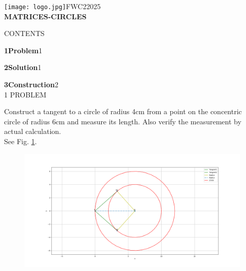 \documentclass[a4paper,10pt]{report}
\begin{document}
\raggedright{\texttt{[image: logo.jpg]}}\hspace{12.425cm}\raggedleft FWC22025\vspace{2mm}\\
\centering\Large\textbf{MATRICES-CIRCLES}\vspace{5mm}
\begin{multicols}{2}
\centering \large\textsc{C}\footnotesize\textsc{ONTENTS}\vspace{5mm}\\
\raggedright\large\textbf{1\hspace{1cm}Problem}\hspace{5.2cm}1\vspace{5mm}\\
\raggedright\large\textbf{2\hspace{1cm}Solution}\hspace{5.25cm}1\vspace{5mm}\\
\raggedright\large\textbf{3\hspace{1cm}Construction}\hspace{4.25cm}2\vspace{5mm}\\
\centering \large\textsc{1  P}\footnotesize\textsc{ROBLEM}\vspace{5mm}\\
\raggedright\large{
\fi
	Construct a tangent to a circle of radius 4cm from a point on the concentric circle of radius 6cm and measure its length. Also verify the measurement by actual calculation.
	\\
	\solution See Fig. 
		\ref{fig:10/11/2/2}.
	\begin{figure}[!ht]
		\centering
 \includegraphics[width=\columnwidth]{chapters/10/11/2/2/figs/main.png}
		\caption{}
		\label{fig:10/11/2/2}
  	\end{figure}
\iffalse
}
\end{multicols}
\end{document}
